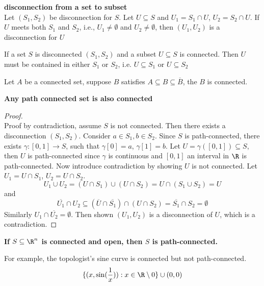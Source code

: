 \documentclass[11pt]{article}
\begin{document}
\begin{defn}
\begin{theorem*}
  \label{disconnection from a set to subset}
  \textbf{disconnection from a set to subset}\\
  Let $(S_1, S_2)$ be disconnection for $S$. Let $U\subseteq S$ and $U_1 = S_1\cap U$, $U_2 = S_2\cap U$. If $U$ meets both $S_1$ and $S_2$, i.e., $U_1 \not=\emptyset$ and $U_2 \not=\emptyset$, then $(U_1, U_2)$ is a disconnection for $U$

  \begin{corollary*}
    If a set $S$ is disconnected $(S_1, S_2)$ and a subset $U\subseteq S$ is connected. Then $U$ must be contained in either $S_1$ or $S_2$, i.e. $U\subseteq S_1$ or $U\subseteq S_2$
  \end{corollary*}

  \begin{corollary*}
    Let $A$ be a connected set, suppose $B$ satisfies $A\subseteq B\subseteq \overline{B}$, the $B$ is connected.
  \end{corollary*}
\end{theorem*}

\begin{theorem*}
  \label{Any set which is path connected is also connected}
  \textbf{Any path connected set is also connected}
  \begin{proof}
    $ $\\
    Proof by contradiction, assume $S$ is not connected. Then there exists a disconnection $(S_1, S_2)$.  Consider $a\in S_1, b\in S_2$. Since $S$ is path-connected, there exists $\gamma: [0,1]\rightarrow S$, such that $\gamma[0] = a$, $\gamma[1] = b$. Let $U= \gamma([0,1])\subseteq S$, then $U$ is path-connected since $\gamma$ is continuous and $[0,1]$ an interval in $\R$ is path-connected. Now introduce contradiction by showing $U$ is not connected. Let $U_1 = U\cap S_1$, $U_2 = U\cap S_2$.
    \[
      U_1\cup U_2 = (U\cap S_1)\cup (U\cap S_2) = U\cap (S_1\cup S_2) = U
    \]
    and
    \[
      \overline{U_1}\cap U_2 \subseteq (\overline{U}\cap \overline{S_1})\cap (U\cap S_2) = \overline{S_1}\cap S_2 = \emptyset
    \]
    Similarly $U_1\cap \overline{U_2}=\emptyset$. Then shown $(U_1, U_2)$ is a disconnection of $U$, which is a contradiction.
  \end{proof}
\end{theorem*}


\begin{theorem*}
  \label{connected set not necessarily path-connected}
  \textbf{If $S\subseteq \R^n$ is connected and open, then $S$ is path-connected.}
  \begin{rem}
    For example, the topologist's sine curve is connected but not path-connected.
    \[
      \{ (x, \sin(\frac{1}{x})): x\in\R \setminus {0} \} \cup (0,0)
    \]
  \end{rem}
\end{theorem*}




\end{defn}
\end{document}
